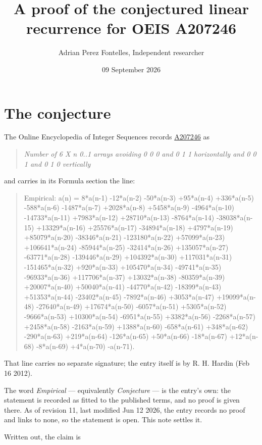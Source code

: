 \documentclass[11pt]{article}
\title{A proof of the conjectured linear recurrence for OEIS A207246}
\author{Adrian Perez Fontelles, Independent researcher}
\date{09 September 2026}
\theoremstyle{definition}
\begin{document}
\maketitle
\section{The conjecture}

The Online Encyclopedia of Integer Sequences records \href{https://oeis.org/A207246}{A207246} as

\begin{quote}\itshape Number of 6 X n 0..1 arrays avoiding 0 0 0 and 0 1 1 horizontally and 0 0 1 and 0 1 0 vertically\end{quote}

and carries in its Formula section the line:

\begin{quote}\ttfamily Empirical: a(n) = 8*a(n-1) -12*a(n-2) -50*a(n-3) +95*a(n-4) +336*a(n-5) -588*a(n-6) -1487*a(n-7) +2028*a(n-8) +5458*a(n-9) -4964*a(n-10) -14733*a(n-11) +7983*a(n-12) +28710*a(n-13) -8764*a(n-14) -38038*a(n-15) +13329*a(n-16) +25576*a(n-17) -34894*a(n-18) +4797*a(n-19) +85079*a(n-20) -38346*a(n-21) -123180*a(n-22) +57099*a(n-23) +106641*a(n-24) -85944*a(n-25) -32414*a(n-26) +135057*a(n-27) -63771*a(n-28) -139446*a(n-29) +104392*a(n-30) +117031*a(n-31) -151465*a(n-32) +920*a(n-33) +105470*a(n-34) -49741*a(n-35) -96933*a(n-36) +117706*a(n-37) +13032*a(n-38) -80359*a(n-39) +20007*a(n-40) +50040*a(n-41) -44770*a(n-42) -18399*a(n-43) +51353*a(n-44) -23402*a(n-45) -7892*a(n-46) +3053*a(n-47) +19099*a(n-48) -27640*a(n-49) +17674*a(n-50) -6057*a(n-51) +5305*a(n-52) -9666*a(n-53) +10300*a(n-54) -6951*a(n-55) +3382*a(n-56) -2268*a(n-57) +2458*a(n-58) -2163*a(n-59) +1388*a(n-60) -658*a(n-61) +348*a(n-62) -290*a(n-63) +219*a(n-64) -126*a(n-65) +50*a(n-66) -18*a(n-67) +12*a(n-68) -8*a(n-69) +4*a(n-70) -a(n-71).\end{quote}

That line carries no separate signature; the entry itself is by R. H. Hardin (Feb 16 2012).

The word {\itshape Empirical} --- equivalently {\itshape Conjecture} --- is the entry's own: the statement is recorded as fitted to the published terms, and no proof is given there. As of revision 11, last modified Jun 12 2026, the entry records no proof and links to none, so the statement is open. This note settles it.

Written out, the claim is
\end{document}
